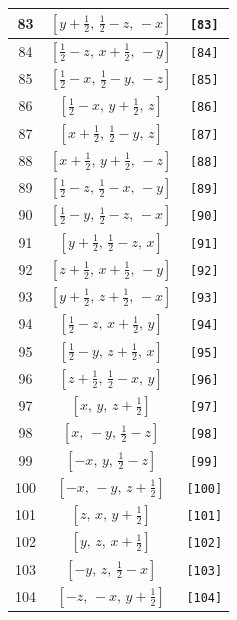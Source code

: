 \documentclass[fleqn,8pt]{jsarticle}
\begin{document}
\begin{longtable}{ccc}
83 & $\left[ y + \frac{1}{2},\, \frac{1}{2} - z,\, - x \right]$ & {\tt [83]} \\ \hline
84 & $\left[ \frac{1}{2} - z,\, x + \frac{1}{2},\, - y \right]$ & {\tt [84]} \\ \hline
85 & $\left[ \frac{1}{2} - x,\, \frac{1}{2} - y,\, - z \right]$ & {\tt [85]} \\ \hline
86 & $\left[ \frac{1}{2} - x,\, y + \frac{1}{2},\, z \right]$ & {\tt [86]} \\ \hline
87 & $\left[ x + \frac{1}{2},\, \frac{1}{2} - y,\, z \right]$ & {\tt [87]} \\ \hline
88 & $\left[ x + \frac{1}{2},\, y + \frac{1}{2},\, - z \right]$ & {\tt [88]} \\ \hline
89 & $\left[ \frac{1}{2} - z,\, \frac{1}{2} - x,\, - y \right]$ & {\tt [89]} \\ \hline
90 & $\left[ \frac{1}{2} - y,\, \frac{1}{2} - z,\, - x \right]$ & {\tt [90]} \\ \hline
91 & $\left[ y + \frac{1}{2},\, \frac{1}{2} - z,\, x \right]$ & {\tt [91]} \\ \hline
92 & $\left[ z + \frac{1}{2},\, x + \frac{1}{2},\, - y \right]$ & {\tt [92]} \\ \hline
93 & $\left[ y + \frac{1}{2},\, z + \frac{1}{2},\, - x \right]$ & {\tt [93]} \\ \hline
94 & $\left[ \frac{1}{2} - z,\, x + \frac{1}{2},\, y \right]$ & {\tt [94]} \\ \hline
95 & $\left[ \frac{1}{2} - y,\, z + \frac{1}{2},\, x \right]$ & {\tt [95]} \\ \hline
96 & $\left[ z + \frac{1}{2},\, \frac{1}{2} - x,\, y \right]$ & {\tt [96]} \\ \hline
97 & $\left[ x,\, y,\, z + \frac{1}{2} \right]$ & {\tt [97]} \\ \hline
98 & $\left[ x,\, - y,\, \frac{1}{2} - z \right]$ & {\tt [98]} \\ \hline
99 & $\left[ - x,\, y,\, \frac{1}{2} - z \right]$ & {\tt [99]} \\ \hline
100 & $\left[ - x,\, - y,\, z + \frac{1}{2} \right]$ & {\tt [100]} \\ \hline
101 & $\left[ z,\, x,\, y + \frac{1}{2} \right]$ & {\tt [101]} \\ \hline
102 & $\left[ y,\, z,\, x + \frac{1}{2} \right]$ & {\tt [102]} \\ \hline
103 & $\left[ - y,\, z,\, \frac{1}{2} - x \right]$ & {\tt [103]} \\ \hline
104 & $\left[ - z,\, - x,\, y + \frac{1}{2} \right]$ & {\tt [104]} \\ \hline

\end{longtable}
\end{document}
